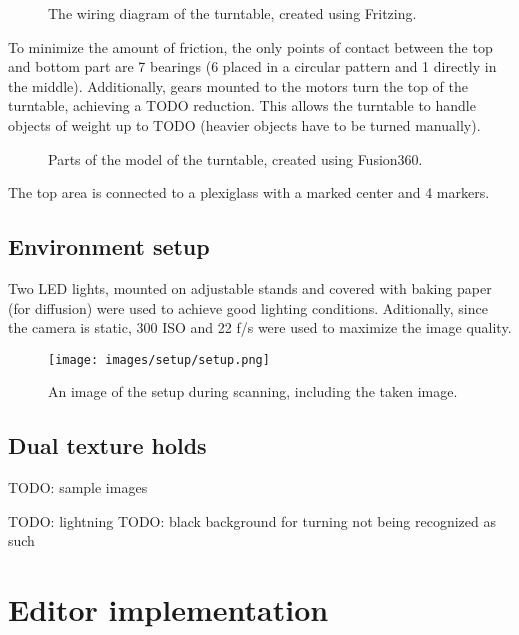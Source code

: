 \begin{figure}
	\centering
	
	\caption{The wiring diagram of the turntable, created using Fritzing.}
	\label{fig:wiring}
\end{figure}

To minimize the amount of friction, the only points of contact between the top and bottom part are 7 bearings (6 placed in a circular pattern and 1 directly in the middle).
Additionally, gears mounted to the motors turn the top of the turntable, achieving a TODO reduction.
This allows the turntable to handle objects of weight up to TODO (heavier objects have to be turned manually).

\begin{figure}
	\centering
	\qquad
	\qquad
	\caption{Parts of the model of the turntable, created using Fusion360.}%
	\label{fig:turntable}
\end{figure}

The top area is connected to a plexiglass with a marked center and 4 markers.

\subsection{Environment setup}
Two LED lights, mounted on adjustable stands and covered with baking paper (for diffusion) were used to achieve good lighting conditions.
Aditionally, since the camera is static, 300 ISO and 22 f/s were used to maximize the image quality.

\begin{figure}
	\centering
	\texttt{[image: images/setup/setup.png]}
	\caption{An image of the setup during scanning, including the taken image.}
\end{figure}

\subsection{Dual texture holds}

TODO: sample images




TODO: lightning
TODO: black background for turning not being recognized as such




\section{Editor implementation}

